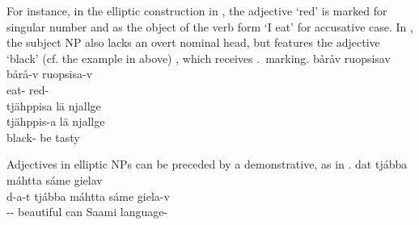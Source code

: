 For instance, in the elliptic construction in , the adjective  ‘red’ %
is marked for singular number and as the object of the verb form  ‘I eat’ for accusative case. In , the subject NP also lacks an overt nominal head, but features the adjective  ‘black’ (cf. the example in  above)%
, which receives \NOMs.\PLs\ marking. 
\ea\label{adjNPheadEx1}
\glll	båråv ruopsisav\\
	bårå-v ruopsisa-v\\
	eat- red-\\\nopagebreak
{}	
\z
\ea\label{adjNPheadEx2}
\glll	tjähppisa lä njallge\\
	tjähppis-a lä njallge\\
	black- be\BS{} tasty\BS{}\\\nopagebreak
{}	
\z

Adjectives in elliptic NPs can be preceded by a demonstrative, %
as in . 
\ea\label{adjNPheadEx3}
\glll	dat tjábba máhtta sáme gielav\\
	d-a-t tjábba máhtta sáme giela-v\\
	-- beautiful\BS{} can\BS{} Saami\BS{} language-\\\nopagebreak
{}	
\z

